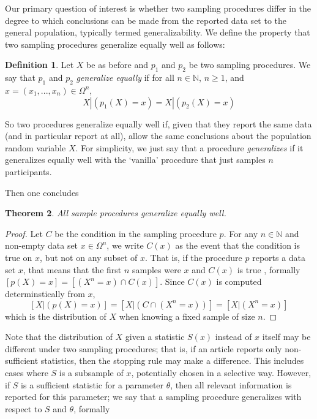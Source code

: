 \documentclass[man]{apa7}\usepackage[]{graphicx}\usepackage[]{xcolor}
\newtheorem{thm}{Theorem}
\theoremstyle{definition}
\newtheorem{defn}[thm]{Definition}
\newcommand{\N} {\mathbb{N}}
\begin{document}
Our primary question of interest is whether two sampling procedures differ in the degree to which conclusions can be made from the reported data set to the general population, typically termed generalizability. We define the property that two sampling procedures generalize equally well as follows:

\begin{defn}
Let $X$ be as before and $p_1$ and $p_2$ be two sampling procedures. We say that $p_1$ and $p_2$ \emph{generalize equally} if for all $n \in \N$, $n\geq1$, and $x = (x_1,...,x_n) \in \Omega^n$,
\begin{equation} X|(p_1(X) = x) = X|(p_2(X) = x) \end{equation}
\end{defn}

So two procedures generalize equally well if, given that they report the same data (and in particular report at all), allow the same conclusions about the population random variable $X$. For simplicity, we just say that a procedure \emph{generalizes} if it generalizes equally well with the `vanilla' procedure that just samples $n$ participants.

Then one concludes
\begin{thm} \label{thm:AllSampleProceduresGeneralize}
All sample procedures generalize equally well.
\end{thm}
\begin{proof}
Let $C$ be the condition in the sampling procedure $p$. For any $n \in \N$ and non-empty data set $x \in \Omega^n$, we write $C(x)$ as the event that the condition is true on $x$, but not on any subset of $x$. That is, if the procedure $p$ reports a data set $x$, that means that the first $n$ samples were $x$ and $C(x)$ is true %
, formally $\left[p(X) = x\right] = \left[(X^n = x) \cap C(x) \right]$. Since $C(x)$ is computed determinstically from $x$,
\begin{equation}\left[X|(p(X) = x) \right] = \left[X|(C \cap (X^n = x)) \right] = \left[X|(X^n = x)\right] \end{equation}
which is the distribution of $X$ when knowing a fixed sample of size $n$.
\end{proof}

Note that the distribution of $X$ given a statistic $S(x)$ instead of $x$ itself may be different under two sampling procedures; that is, if an article reports only non-sufficient statistics, then the stopping rule may make a difference. This includes cases where $S$ is a subsample of $x$, potentially chosen in a selective way. However, if $S$ is a sufficient statistic for a parameter $\theta$, then all relevant information is reported for this parameter; we say that a sampling procedure generalizes with respect to $S$ and $\theta$, formally
\end{document}
